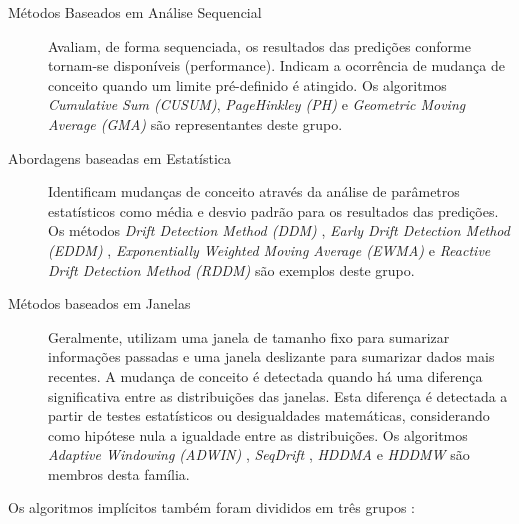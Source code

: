 \documentclass[qual, classic, a4paper]{ufbathesis}
\begin{document}
\begin{description}
    \item[Métodos Baseados em Análise Sequencial] Avaliam, de forma sequenciada, os resultados das predições conforme tornam-se disponíveis (performance).
    Indicam a ocorrência de mudança de conceito quando um limite pré-definido é atingido.
    Os algoritmos \textit{Cumulative Sum (CUSUM)}, \textit{PageHinkley (PH)} \cite{Page:CUSUM:PageHinkley:1954} e \textit{Geometric Moving Average (GMA)} \cite{Roberts:2000:CCT:338441.338464}
    são representantes deste grupo.

    \item[Abordagens baseadas em Estatística] Identificam mudanças de conceito através da análise de parâmetros estatísticos como média e desvio padrão para os resultados das predições.
    Os métodos \textit{Drift Detection Method (DDM)} \cite{GamaMCR04}, 
    \textit{Early Drift Detection Method (EDDM)} \cite{EDDM}, 
    \textit{Exponentially Weighted Moving Average (EWMA)} \cite{Ross:2012:EWM:2076039.2076307} e 
    \textit{Reactive Drift Detection Method (RDDM)} \cite{Barros:RDDM:2017} são exemplos deste grupo.

    \item[Métodos baseados em Janelas] Geralmente, utilizam uma janela de tamanho fixo para sumarizar informações passadas e uma janela deslizante para sumarizar dados mais recentes.
    A mudança de conceito é detectada quando há uma diferença significativa entre as distribuições das janelas.
    Esta diferença é detectada a partir de testes estatísticos ou desigualdades matemáticas, considerando como hipótese nula a igualdade entre as distribuições.
    Os algoritmos 
    \textit{Adaptive Windowing (ADWIN)} \cite{BifetG07}, 
    \textit{SeqDrift} \cite{PearsSK14:SeqDrift:2014}, 
    \textit{HDDMA} e \textit{HDDMW} \cite{BlancoCRBDM15:HDDMA:HDDMW:2015}
    são membros desta família.
\end{description}

Os algoritmos implícitos também foram divididos em três grupos \cite{GONCALVES20148144}:
\end{document}
